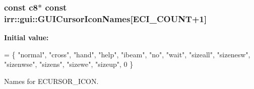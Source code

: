 \subsubsection[{\texorpdfstring{G\+U\+I\+Cursor\+Icon\+Names}{GUICursorIconNames}}]{\setlength{\rightskip}{0pt plus 5cm}const {\bf c8}$\ast$ const irr\+::gui\+::\+G\+U\+I\+Cursor\+Icon\+Names\mbox{[}E\+C\+I\+\_\+\+C\+O\+U\+NT+1\mbox{]}}\hypertarget{namespaceirr_1_1gui_a33bd57d04dbf92750f64a244df85cd51}{}\label{namespaceirr_1_1gui_a33bd57d04dbf92750f64a244df85cd51}
{\bfseries Initial value\+:}
\begin{DoxyCode}
=
    \{
        \textcolor{stringliteral}{"normal"},
        \textcolor{stringliteral}{"cross"},
        \textcolor{stringliteral}{"hand"},
        \textcolor{stringliteral}{"help"},
        \textcolor{stringliteral}{"ibeam"},
        \textcolor{stringliteral}{"no"},
        \textcolor{stringliteral}{"wait"},
        \textcolor{stringliteral}{"sizeall"},
        \textcolor{stringliteral}{"sizenesw"},
        \textcolor{stringliteral}{"sizenwse"},
        \textcolor{stringliteral}{"sizens"},
        \textcolor{stringliteral}{"sizewe"},
        \textcolor{stringliteral}{"sizeup"},
        0
    \}
\end{DoxyCode}


Names for E\+C\+U\+R\+S\+O\+R\+\_\+\+I\+C\+ON. 

